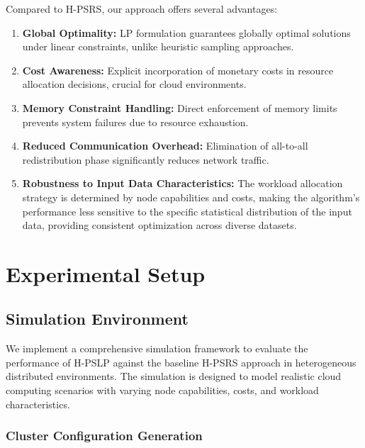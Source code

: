 \documentclass[]{interact}
\theoremstyle{plain}
\theoremstyle{definition}
\theoremstyle{remark}
\begin{document}
Compared to H-PSRS, our approach offers several advantages:

\begin{enumerate}
\item \textbf{Global Optimality:} LP formulation guarantees globally optimal solutions under linear constraints, unlike heuristic sampling approaches.

\item \textbf{Cost Awareness:} Explicit incorporation of monetary costs in resource allocation decisions, crucial for cloud environments.

\item \textbf{Memory Constraint Handling:} Direct enforcement of memory limits prevents system failures due to resource exhaustion.

\item \textbf{Reduced Communication Overhead:} Elimination of all-to-all redistribution phase significantly reduces network traffic.

\item \textbf{Robustness to Input Data Characteristics:} The workload allocation strategy is determined by node capabilities and costs, making the algorithm's performance less sensitive to the specific statistical distribution of the input data, providing consistent optimization across diverse datasets.
\end{enumerate}



\section{Experimental Setup}
\label{sec:experimental_setup}

\subsection{Simulation Environment}

We implement a comprehensive simulation framework to evaluate the performance of H-PSLP against the baseline H-PSRS approach in heterogeneous distributed environments. The simulation is designed to model realistic cloud computing scenarios with varying node capabilities, costs, and workload characteristics.

\subsubsection{Cluster Configuration Generation}
\end{document}
